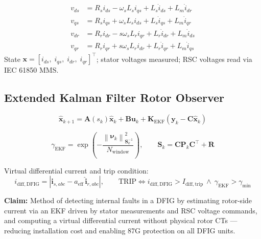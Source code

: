 \documentclass[12pt, a4paper]{report}
\newcommand{\vect}[1]{\boldsymbol{#1}}
\newcommand{\mat}[1]{\mathbf{#1}}
\newcommand{\norm}[1]{\left\lVert#1\right\rVert}
\begin{document}
\begin{tcolorbox}[mathbox]
\begin{align}
  v_{ds} &= R_s i_{ds} - \omega_s L_s i_{qs} + L_s\dot{i}_{ds} + L_m\dot{i}_{dr} \\
  v_{qs} &= R_s i_{qs} + \omega_s L_s i_{ds} + L_s\dot{i}_{qs} + L_m\dot{i}_{qr} \\
  v_{dr} &= R_r i_{dr} - s\omega_s L_r i_{qr} + L_r\dot{i}_{dr} + L_m\dot{i}_{ds} \\
  v_{qr} &= R_r i_{qr} + s\omega_s L_r i_{dr} + L_r\dot{i}_{qr} + L_m\dot{i}_{qs}
\end{align}
State $\vect{x} = [i_{ds},\; i_{qs},\; i_{dr},\; i_{qr}]^\top$; stator voltages measured; RSC voltages read via IEC 61850 MMS.
\end{tcolorbox}

\subsection{Extended Kalman Filter Rotor Observer}

\begin{equation}
  \hat{\vect{x}}_{k+1} = \mat{A}(s_k)\hat{\vect{x}}_k + \mat{B}\vect{u}_k + \mat{K}_\mathrm{EKF}(\vect{y}_k - \mat{C}\hat{\vect{x}}_k)
\end{equation}

\begin{equation}
  \gamma_\mathrm{EKF} = \exp\!\left(-\frac{\norm{\vect{\nu}_k}^2_{\mat{S}_k^{-1}}}{N_\mathrm{window}}\right),
  \qquad \mat{S}_k = \mat{C}\mat{P}_k\mat{C}^\top + \mat{R}
\end{equation}

Virtual differential current and trip condition:
\begin{equation}
  i_\mathrm{diff,DFIG} = \left|\vect{i}_{s,abc} - a_\mathrm{eff}\,\hat{\vect{i}}_{r,abc}\right|, \qquad
  \mathrm{TRIP} \iff i_\mathrm{diff,DFIG} > I_\mathrm{diff,trip}\ \wedge\ \gamma_\mathrm{EKF} > \gamma_\mathrm{min}
\end{equation}

\begin{tcolorbox}[ipbox, title={IP — Patent Family P4}]
\textbf{Claim:} Method of detecting internal faults in a DFIG by estimating rotor-side current via an EKF driven by stator measurements and RSC voltage commands, and computing a virtual differential current without physical rotor CTs — reducing installation cost and enabling 87G protection on all DFIG units.
\end{tcolorbox}
\end{document}
